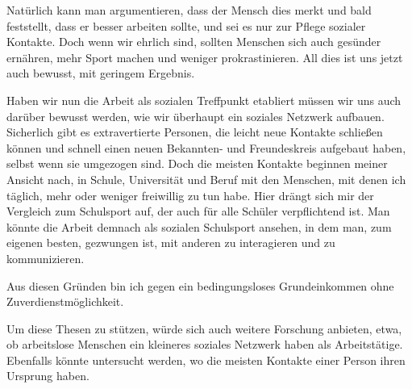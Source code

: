 \documentclass[doc]{apa6}
\begin{document}
        Natürlich kann man argumentieren, dass der Mensch dies merkt und bald feststellt, dass er besser arbeiten sollte, und sei es nur zur Pflege sozialer Kontakte. Doch wenn wir ehrlich sind, sollten Menschen sich auch gesünder ernähren, mehr Sport machen und weniger prokrastinieren. All dies ist uns jetzt auch bewusst, mit geringem Ergebnis.
        
        Haben wir nun die Arbeit als sozialen Treffpunkt etabliert müssen wir uns auch darüber bewusst werden, wie wir überhaupt ein soziales Netzwerk aufbauen. Sicherlich gibt es extravertierte Personen, die leicht neue Kontakte schließen können und schnell einen neuen Bekannten- und Freundeskreis aufgebaut haben, selbst wenn sie umgezogen sind. Doch die meisten Kontakte beginnen meiner Ansicht nach, in Schule, Universität und Beruf mit den Menschen, mit denen ich täglich, mehr oder weniger freiwillig zu tun habe. Hier drängt sich mir der Vergleich zum Schulsport auf, der auch für alle Schüler verpflichtend ist. Man könnte die Arbeit demnach als sozialen Schulsport ansehen, in dem man, zum eigenen besten, gezwungen ist, mit anderen zu interagieren und zu kommunizieren.
        
        Aus diesen Gründen bin ich gegen ein bedingungsloses Grundeinkommen ohne Zuverdienstmöglichkeit.
        
        Um diese Thesen zu stützen, würde sich auch weitere Forschung anbieten, etwa, ob arbeitslose Menschen ein kleineres soziales Netzwerk haben als Arbeitstätige. Ebenfalls könnte untersucht werden, wo die meisten Kontakte einer Person ihren Ursprung haben.
        
        
        
    \printbibliography
\end{document}
